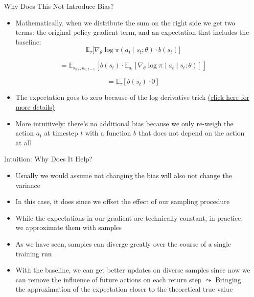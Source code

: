 \documentclass[aspectratio=169]{../latex_main/tntbeamer}  %
\begin{document}
\begin{frame}[c]{Why Does This Not Introduce Bias?}

\begin{itemize}
	\item Mathematically, when we distribute the sum on the right side we get two terms: the original policy gradient term, and an \alert{expectation that includes the baseline}: 
    $$ \mathbb{E}_\tau \bigg [ \nabla_\theta \log \pi(a_t \mid s_t; \theta) \cdot b(s_t) \bigg ]$$
	
	$$= \mathbb{E}_{s_{0;t},a_{0;t-1}} \left[ b(s_t)  \cdot \mathbb{E}_{a_t} \left[ \nabla_\theta \log \pi(a_t \mid s_t; \theta) \right] \right] $$
    
    $$=\mathbb{E}_\tau \left[ b(s_t) \cdot 0 \right] $$
	
	\item The expectation goes to zero because of the log derivative trick \href{https://danieltakeshi.github.io/2017/03/28/going-deeper-into-reinforcement-learning-fundamentals-of-policy-gradients/}{\alert{(click here for more details)}}

	\item More intuitively: there's no additional bias because we only re-weigh the action $a_t$ at timestep $t$ with a function $b$ that does not depend on the action at all
	
\end{itemize}
	
\end{frame}
\begin{frame}[c]{Intuition: Why Does It Help?}

\begin{itemize}
	\item Usually we would assume not changing the bias will also not change the variance
	
	\item In this case, it does since we offset the effect of our sampling procedure
 
	\item While the expectations in our gradient are technically constant, in practice, we approximate them with samples

    \item As we have seen, samples can diverge greatly over the course of a single training run
	
	\item With the baseline, we can get better updates on diverse samples since now we can remove the influence of future actions on each return step
 \newline
 $\leadsto$ Bringing the approximation of the expectation closer to the theoretical true value
\end{itemize}
	
\end{frame}
	
\end{document}
